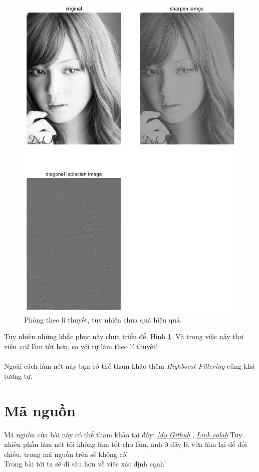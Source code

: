 \documentclass{article}
\begin{document}
    \begin{figure}[ht!]
        \centering
        \includegraphics[width =0.9\linewidth]{download (8).png}
        \caption{Phỏng theo lí thuyết, tuy nhiên chưa quá hiệu quả.}
        \label{fig15}
    \end{figure}
    Tuy nhiên những khắc phục này chưa triển để. Hình \ref{fig15}. Và trong việc này thư viện \textit{cv2} làm tốt hơn, so với tự làm theo lí thuyết!
    \\ \\
    Ngoài cách làm nét này bạn có thể tham khảo thêm \textit{Highboost Filtering} cũng khá tương tự.
    \section{Mã nguồn}
    Mã nguồn của bài này có thể tham khảo tại đây:
    \href{https://github.com/thuantn210823/Computer-Vision-IPSAL-LAB-}{ \textit{My Github}}
    , \href{https://colab.research.google.com/drive/1OJPnCVz51zampZyWqOYpRambrDB2h50P#scrollTo=qPMVzpSSz6Ft}{\textit{Link colab}}
    Tuy nhiên phần làm nét tôi không làm tốt cho lắm, ảnh ở đây là vừa làm lại để đối chiếu, trong mã nguồn trên sẽ không có!\\
    Trong bài tới ta sẽ đi sâu hơn về việc xác định cạnh!
    
\end{document}
